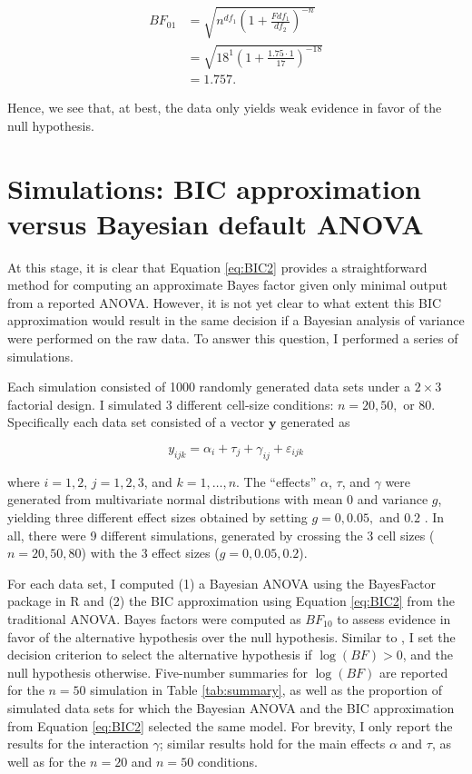 \documentclass[]{article}
\begin{document}
\begin{align*}
BF_{01} &= \sqrt{n^{df_1}\left(1+\frac{Fdf_1}{df_2}\right)^{-n}}\\
        & = \sqrt{18^1\left(1+\frac{1.75\cdot 1}{17}\right)^{-18}}\\
  &= 1.757.
\end{align*}

\noindent
Hence, we see that, at best, the data only yields weak evidence in favor of the null hypothesis.

\section{Simulations: BIC approximation versus Bayesian default ANOVA}

At this stage, it is clear that Equation \ref{eq:BIC2} provides a straightforward method for computing an approximate Bayes factor given only minimal output from a reported ANOVA.  However, it is not yet clear to what extent this BIC approximation would result in the same decision if a Bayesian analysis of variance \cite{rouder2012} were performed on the raw data.  To answer this question, I performed a series of simulations.

Each simulation consisted of 1000 randomly generated data sets under a $2\times 3$ factorial design.  I simulated 3 different cell-size conditions: $n=20, 50,$ or $80$. Specifically each data set consisted of a vector $\mathbf{y}$ generated as

\[
  y_{ijk} = \alpha_i + \tau_j + \gamma_{ij} +\varepsilon_{ijk}
\]

\noindent
where $i=1,2$, $j=1,2,3$, and $k=1,\dots, n$.  The ``effects'' $\alpha$, $\tau$, and $\gamma$ were generated from multivariate normal distributions with mean 0 and variance $g$, yielding three different effect sizes obtained by setting $g = 0, 0.05,$ and $0.2$ \cite{wang2017}.  In all, there were 9 different simulations, generated by crossing the 3 cell sizes ($n=20, 50, 80$) with the 3 effect sizes ($g=0, 0.05, 0.2$).

For each data set, I computed (1) a Bayesian ANOVA using the BayesFactor package in R \cite{bayesfactor} and (2) the BIC approximation using Equation \ref{eq:BIC2} from the traditional ANOVA.  Bayes factors were computed as $BF_{10}$ to assess evidence in favor of the alternative hypothesis over the null hypothesis.  Similar to \cite{wang2017}, I set the decision criterion to select the alternative hypothesis if $\log(BF)>0$, and the null hypothesis otherwise.  Five-number summaries for $\log(BF)$ are reported for the $n=50$ simulation in Table \ref{tab:summary}, as well as the proportion of simulated data sets for which the Bayesian ANOVA and the BIC approximation from Equation \ref{eq:BIC2} selected the same model.  For brevity, I only report the results for the interaction $\gamma$; similar results hold for the main effects $\alpha$ and $\tau$, as well as for the $n=20$ and $n=50$ conditions.
\end{document}
